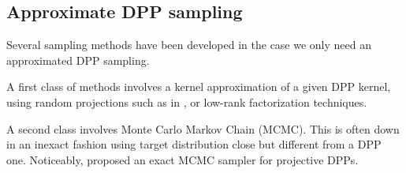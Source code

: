 \subsection{Approximate DPP sampling}
Several sampling methods have been developed in the case we only need an approximated DPP sampling.

A first class of methods involves a kernel approximation of a given DPP kernel, using random projections such as in \cite{kulesza2012_dpp_for_ml}, or low-rank factorization techniques.

A second class involves Monte Carlo Markov Chain (MCMC). This is often down in an inexact fashion using target distribution close but different from a DPP one. Noticeably, \cite{gautier2017_zonotope_for_dpp_sampling} proposed an exact MCMC sampler for projective DPPs.

